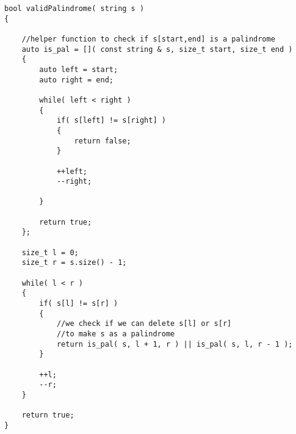 \setcounter{lstlisting}{0}
\begin{lstlisting}[style=customc, caption={Greedy}]
bool validPalindrome( string s )
{

    //helper function to check if s[start,end] is a palindrome
    auto is_pal = []( const string & s, size_t start, size_t end )
    {
        auto left = start;
        auto right = end;

        while( left < right )
        {
            if( s[left] != s[right] )
            {
                return false;
            }

            ++left;
            --right;

        }

        return true;
    };

    size_t l = 0;
    size_t r = s.size() - 1;

    while( l < r )
    {
        if( s[l] != s[r] )
        {
            //we check if we can delete s[l] or s[r]
            //to make s as a palindrome
            return is_pal( s, l + 1, r ) || is_pal( s, l, r - 1 );
        }

        ++l;
        --r;
    }

    return true;
}
\end{lstlisting} 